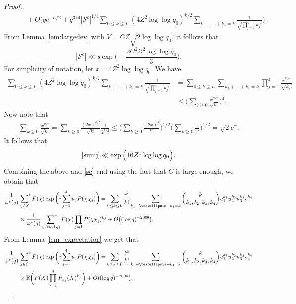 \documentclass[10pt,a4paper]{amsart}
\def\sumstar{\sideset{}{^*}\sum}
\newcommand{\E}{\mathbb{E}}
\renewcommand{\pmod}[1]{\,(\mathrm{mod}\,#1)}
\begin{document}
\begin{proof}
\begin{align*}
&\qquad + O \Bigg(  q e^{-L/2} + q^{3/4} |\mathcal{S}^c|^{1/4} \sum_{0 \leq k \leq L} (4 Z^2 \log \log q_0)^{k/2}\sum_{k_1+\ldots +k_4=k} \frac{1}{ \sqrt{ \prod_{j=1}^4 k_j!}}  \Bigg).
\end{align*}
From Lemma \ref{lem:largedev} with $V= CZ \sqrt{2 \log\log q_0}$, it follows that
\begin{equation}
\label{sc}
    |\mathcal{S}^c| \ll q \exp \Big(  -\frac{2 C^2 Z^2 \log \log q_0}{3} \Big).
    \end{equation} 
For simplicity of notation, let $x = 4Z^2 \log \log q_0$. We have
\begin{align}
 \label{sumj}   \sum_{0 \leq k \leq L}   (4 Z^2 \log \log q_0)^{k/2}  \sum_{k_1+\ldots +k_4=k} \frac{1}{ \sqrt{ \prod_{j=1}^4k_j!}} &=  \sum_{0 \leq k \leq L}   \sum_{k_1+\ldots +k_4=k}\prod_{j=1}^4 \frac{x^{k_j/2}}{ \sqrt{  k_j!}} \\
    & \leq \Big( \sum_{k \geq 0} \frac{x^{k/2}}{\sqrt{k!}}\Big)^4. \nonumber 
\end{align}
Now note that 
\begin{align*}
  \sum_{k \geq 0} \frac{x^{k/2}}{\sqrt{k!}} = \sum_{k \geq 0} \frac{(2x)^{k/2}}{\sqrt{k!}} \frac{1}{2^{k/2}}  \leq \Big(  \sum_{k \geq 0} \frac{(2x)^k}{k!}\Big)^{1/2} \Big( \sum_{k\geq 0} \frac{1}{2^k} \Big)^{1/2}  = \sqrt{2} e^x.
\end{align*}
It follows that
\begin{equation*}
    \eqref{sumj} \ll \exp \Big(  16 Z^2 \log \log q_0 \Big).
\end{equation*}
Combining the above and \eqref{sc} and using the fact that $C$ is large enough, we obtain that 
\begin{align*}
 \frac{1}{\varphi^{*}(q)} & \sumstar_{\chi \in \mathcal{S}}  F(\chi)  
\exp\bigg(  i\sum_{j=1}^4 u_jP(\chi\chi_j)\bigg)  = \sum_{0 \leq k \leq L} \frac{i^k}{k!} \sum_{k_1+\ldots +k_4=k} {k \choose k_1,k_2,k_3,k_4} u_1^{k_1} u_2^{k_2} u_3^{k_3} u_4^{k_4} \\
& \times \frac{1}{\varphi^{*}(q)}\ \sumstar_{\chi \pmod q} F(\chi)  \prod_{j=1}^4 P(\chi \chi_j)^{k_j} +O \big( (\log q)^{-2000} \big). 
\end{align*}
From Lemma \ref{lem_expectation} we get that
\begin{align*}
 \frac{1}{\varphi^{*}(q)} & \sumstar_{\chi \in \mathcal{S}}  F(\chi)  
\exp\bigg(  i\sum_{j=1}^4 u_jP(\chi\chi_j)\bigg)  = \sum_{0 \leq k \leq L} \frac{i^k}{k!} \sum_{k_1+\ldots +k_4=k} {k \choose k_1,k_2,k_3,k_4} u_1^{k_1} u_2^{k_2} u_3^{k_3} u_4^{k_4}\\
& \times \E\bigg(  F(X) \prod_{j=1}^4 P_{\chi_j}(X)^{k_j}\bigg)+ O \big( (\log q)^{-2000} \big). 
\end{align*}


\end{proof}
\end{document}
